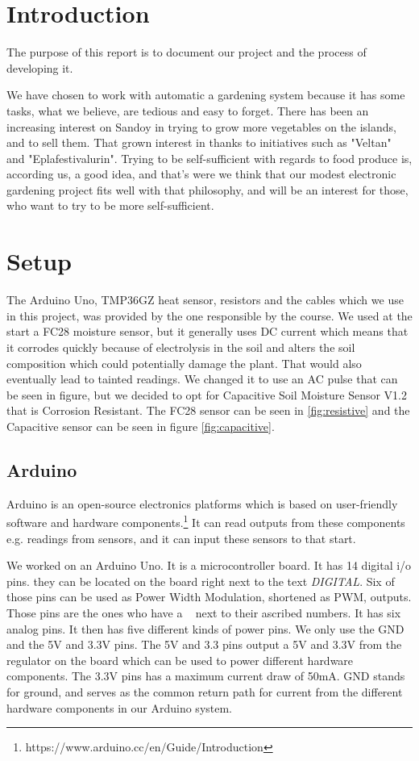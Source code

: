 \documentclass[a4paper,12pt,twoside,openright,titlepage]{book}
\begin{document}
\mainmatter
\chapter{Introduction}

The purpose of this report is to document our project and the process of developing it.

We have chosen to work with automatic a gardening system because it has some tasks, what we believe, are tedious and easy to forget. There has been an increasing interest on Sandoy in trying to grow more vegetables on the islands, and to sell them. That grown interest in thanks to initiatives such as "Veltan" and "Eplafestivalurin". Trying to be self-sufficient with regards to food produce is, according us, a good idea, and that's were we think that our modest electronic gardening project fits well with that philosophy, and will be an interest for those, who want to try to be more self-sufficient.
 

\chapter{Setup}
The Arduino Uno, TMP36GZ heat sensor, resistors and the cables which we use in this project, was provided by the one responsible by the course. We used at the start a FC28 moisture sensor, but it generally uses DC current which means that it corrodes quickly because of electrolysis in the soil and alters the soil composition which could potentially damage the plant. That would also eventually lead to tainted readings. We changed it to use an AC pulse that can be seen in figure, but we decided to opt for Capacitive Soil Moisture Sensor V1.2 that is Corrosion Resistant. The FC28 sensor can be seen in \ref{fig:resistive} and the Capacitive sensor can be seen in figure \ref{fig:capacitive}.

\section{Arduino}
Arduino is an open-source electronics platforms which is based on user-friendly software and hardware components.\footnote{https://www.arduino.cc/en/Guide/Introduction} It can read outputs from these components e.g. readings from sensors, and it can input these sensors to that start.

We worked on an Arduino Uno. It is a microcontroller board. It has 14 digital i/o pins. they can be located on the board right next to the text \textit{DIGITAL}. Six of those pins can be used as Power Width Modulation, shortened as PWM, outputs. Those pins are the ones who have a ~ next to their ascribed numbers. It has six analog pins. It then has five different kinds of power pins. We only use the GND and the 5V and 3.3V pins. The 5V and 3.3 pins output a 5V and 3.3V from the regulator on the board which can be used to power different hardware components. The 3.3V pins has a maximum current draw of 50mA. GND stands for ground, and serves as the common return path for current from the different hardware components in our Arduino system. 
\end{document}
